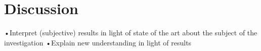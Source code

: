 \section{Discussion}

•Interpret (subjective) results in light of state of the art about the subject of
the investigation
•Explain new understanding in light of results
